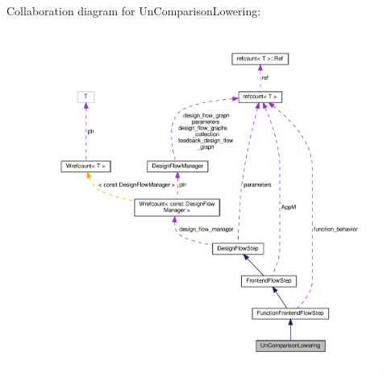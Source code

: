 Collaboration diagram for Un\+Comparison\+Lowering\+:
\nopagebreak
\begin{figure}[H]
\begin{center}
\leavevmode
\includegraphics[width=350pt]{d2/def/classUnComparisonLowering__coll__graph}
\end{center}
\end{figure}
